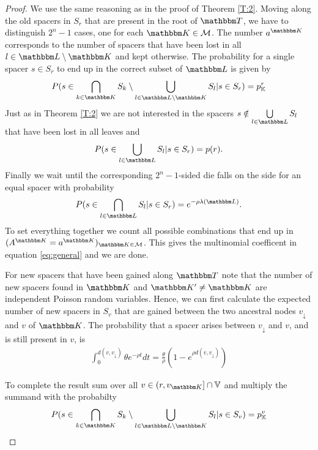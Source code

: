 \documentclass[preprint,authoryear]{elsarticle}
\theoremstyle{definition}
\numberwithin{equation}{section}
\numberwithin{figure}{section}
\begin{document}
\begin{proof} 
 We use the same reasoning as in the proof of Theorem \ref{T:2}.
 Moving along the old spacers in $S_r$ that are present in the root of $\mathbbm T$, we have to distinguish $2^n-1$ cases, one for each $\mathbbm K \in \mathcal M$.
 The number $a^{\mathbbm K}$ corresponds to the number of spacers that have been lost in all $l \in \mathbbm L \setminus \mathbbm K$ and kept otherwise.
 The probability for a single spacer $s \in S_r$ to end up
 in the correct subset of $\mathbbm L$  is given by 
 \begin{equation*}
    P( s \in \bigcap\limits_{k \in \mathbbm K} S_k \setminus \bigcup\limits_{l \in \mathbbm L \setminus \mathbbm K} S_l | s \in S_r ) =
      p_{\mathbb K}^r
 \end{equation*}
 Just as in Theorem \ref{T:2} we are not interested in the spacers $s \notin \bigcup\limits_{l \in \mathbbm L} S_l$ that have been lost in all leaves and 
 \begin{equation*}
     P(s \in \bigcup\limits_{l \in \mathbbm L} S_l | s \in S_r) = p(r).
 \end{equation*}
 Finally we wait until the corresponding $2^n-1$-sided die falls on the side for an equal spacer with probability
 \begin{equation*}
     P(s \in \bigcap\limits_{l \in \mathbbm L} S_l | s \in S_r) = e^{-\rho \lambda(\mathbbm L)}.
 \end{equation*}
 To set everything together we count
 all possible combinations that end up in $(A^{\mathbbm K} = a^{\mathbbm K})_{\mathbbm K \in \mathcal M}$.
 This gives the multinomial coefficent in equation \eqref{eq:general} and we are done.
 
 For new spacers that have been gained along $\mathbbm T$ note that the number of 
 new spacers found in $\mathbbm K$ and $\mathbbm K' \neq \mathbbm K$ are independent Poisson random variables.
 Hence, we can first calculate the expected number of new spacers in $S_v$ that are gained between the two ancestral nodes $v_{\downarrow}$ and $v$ of $\mathbbm K$. 
 The probability that a spacer arises between $v_\downarrow$ and $v$,
  and is still present in $v$, is
  \begin{align*}
    \int_0^{d(v,v_\downarrow)} \theta e^{-\rho t}  dt = \frac\theta\rho (1-e^{\rho d(v,v_\downarrow)})
  \end{align*}


 To complete the result sum over all $v \in (r,v_{\mathbbm K}] \cap \mathbb V$ and multiply the summand with the probabilty 
 \begin{equation*}
  P( s \in \bigcap\limits_{k \in \mathbbm K} S_k \setminus \bigcup\limits_{l \in \mathbbm L \setminus \mathbbm K} S_l | s \in S_v )
  = p_{\mathbb K}^v
 \end{equation*}
 

 

 
 
 \end{proof}
\end{document}
